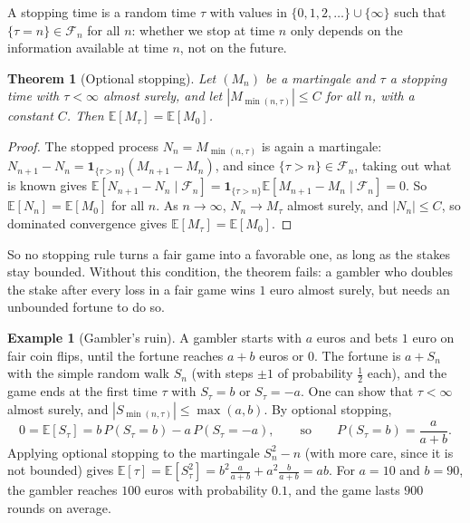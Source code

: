 \documentclass[11pt]{article}
\newcommand{\E}{\mathbb{E}}
\theoremstyle{definition}
\newtheorem{example}[definition]{Example}
\theoremstyle{plain}
\newtheorem{theorem}[definition]{Theorem}
\theoremstyle{remark}
\begin{document}
A stopping time is a random time $\tau$ with values in $\{0, 1, 2, \ldots\} \cup \{\infty\}$ such that $\{\tau = n\} \in \mathcal{F}_n$ for all $n$: whether we stop at time $n$ only depends on the information available at time $n$, not on the future.

\begin{theorem}[Optional stopping]\label{thm:optional-stopping}
    Let $(M_n)$ be a martingale and $\tau$ a stopping time with $\tau < \infty$ almost surely, and let $|M_{\min(n, \tau)}| \leq C$ for all $n$, with a constant $C$. Then $\E[M_\tau] = \E[M_0]$.
\end{theorem}

\begin{proof}
    The stopped process $N_n = M_{\min(n, \tau)}$ is again a martingale: $N_{n+1} - N_n = \mathbf{1}_{\{\tau > n\}}(M_{n+1} - M_n)$, and since $\{\tau > n\} \in \mathcal{F}_n$, taking out what is known gives $\E[N_{n+1} - N_n \mid \mathcal{F}_n] = \mathbf{1}_{\{\tau > n\}}\E[M_{n+1} - M_n \mid \mathcal{F}_n] = 0$. So $\E[N_n] = \E[M_0]$ for all $n$. As $n \to \infty$, $N_n \to M_\tau$ almost surely, and $|N_n| \leq C$, so dominated convergence gives $\E[M_\tau] = \E[M_0]$.
\end{proof}

So no stopping rule turns a fair game into a favorable one, as long as the stakes stay bounded. Without this condition, the theorem fails: a gambler who doubles the stake after every loss in a fair game wins $1$ euro almost surely, but needs an unbounded fortune to do so.

\begin{example}[Gambler's ruin]\label{ex:gamblers-ruin}
    A gambler starts with $a$ euros and bets $1$ euro on fair coin flips, until the fortune reaches $a + b$ euros or $0$. The fortune is $a + S_n$ with the simple random walk $S_n$ (with steps $\pm 1$ of probability $\frac{1}{2}$ each), and the game ends at the first time $\tau$ with $S_\tau = b$ or $S_\tau = -a$. One can show that $\tau < \infty$ almost surely, and $|S_{\min(n, \tau)}| \leq \max(a, b)$. By optional stopping,
    \[0 = \E[S_\tau] = b\,P(S_\tau = b) - a\,P(S_\tau = -a), \qquad \text{so} \qquad P(S_\tau = b) = \frac{a}{a + b}.\]
    Applying optional stopping to the martingale $S_n^2 - n$ (with more care, since it is not bounded) gives $\E[\tau] = \E[S_\tau^2] = b^2\frac{a}{a + b} + a^2\frac{b}{a + b} = ab$. For $a = 10$ and $b = 90$, the gambler reaches $100$ euros with probability $0.1$, and the game lasts $900$ rounds on average.
\end{example}
\end{document}
